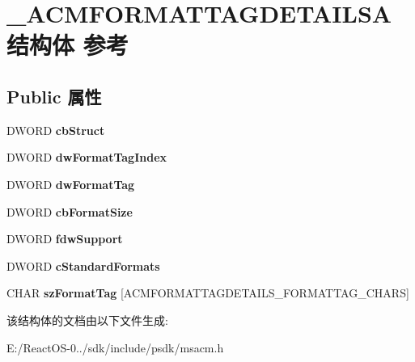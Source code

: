 \hypertarget{struct___a_c_m_f_o_r_m_a_t_t_a_g_d_e_t_a_i_l_s_a}{}\section{\+\_\+\+A\+C\+M\+F\+O\+R\+M\+A\+T\+T\+A\+G\+D\+E\+T\+A\+I\+L\+S\+A结构体 参考}
\label{struct___a_c_m_f_o_r_m_a_t_t_a_g_d_e_t_a_i_l_s_a}
\subsection*{Public 属性}
\begin{DoxyCompactItemize}
\item 
\mbox{\label{struct___a_c_m_f_o_r_m_a_t_t_a_g_d_e_t_a_i_l_s_a_a1da7b1ffc7b2e3f88fa390c8fa4be6e0}} 
D\+W\+O\+RD {\bfseries cb\+Struct}
\item 
\mbox{\label{struct___a_c_m_f_o_r_m_a_t_t_a_g_d_e_t_a_i_l_s_a_a658cfe9d053125abc776302dc247c9d5}} 
D\+W\+O\+RD {\bfseries dw\+Format\+Tag\+Index}
\item 
\mbox{\label{struct___a_c_m_f_o_r_m_a_t_t_a_g_d_e_t_a_i_l_s_a_ad608b6635592f73872b8b7f47c11d6c1}} 
D\+W\+O\+RD {\bfseries dw\+Format\+Tag}
\item 
\mbox{\label{struct___a_c_m_f_o_r_m_a_t_t_a_g_d_e_t_a_i_l_s_a_a9c67889d92b9d9821c6d6c13ab15db12}} 
D\+W\+O\+RD {\bfseries cb\+Format\+Size}
\item 
\mbox{\label{struct___a_c_m_f_o_r_m_a_t_t_a_g_d_e_t_a_i_l_s_a_a6ed827d13c4be63ec24d3f3debfc71e4}} 
D\+W\+O\+RD {\bfseries fdw\+Support}
\item 
\mbox{\label{struct___a_c_m_f_o_r_m_a_t_t_a_g_d_e_t_a_i_l_s_a_a83478d0ff519be7f3434721f653731c9}} 
D\+W\+O\+RD {\bfseries c\+Standard\+Formats}
\item 
\mbox{\label{struct___a_c_m_f_o_r_m_a_t_t_a_g_d_e_t_a_i_l_s_a_a5c563d59aa9d65a09ab36136693eb889}} 
C\+H\+AR {\bfseries sz\+Format\+Tag} \mbox{[}A\+C\+M\+F\+O\+R\+M\+A\+T\+T\+A\+G\+D\+E\+T\+A\+I\+L\+S\+\_\+\+F\+O\+R\+M\+A\+T\+T\+A\+G\+\_\+\+C\+H\+A\+RS\mbox{]}
\end{DoxyCompactItemize}


该结构体的文档由以下文件生成\+:\begin{DoxyCompactItemize}
\item 
E\+:/\+React\+O\+S-\/0../sdk/include/psdk/msacm.\+h\end{DoxyCompactItemize}
